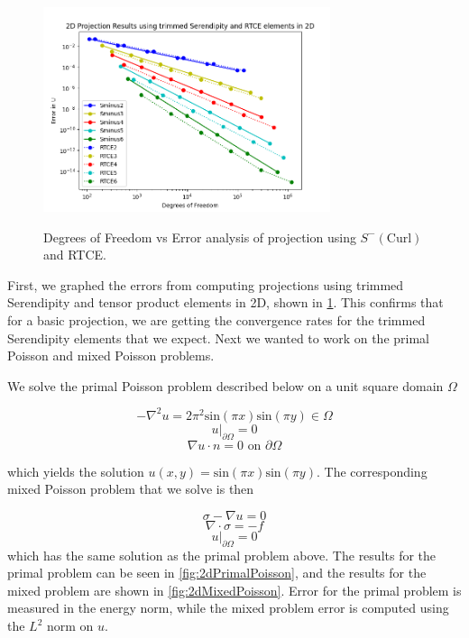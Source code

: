 \documentclass[manuscript,screen]{acmart}
\begin{document}
\begin{figure}[h!]
  \caption{Degrees of Freedom vs Error analysis of projection using $S^-(\text{Curl})$ and RTCE.}
  \includegraphics[width=0.75\textwidth]{2dProjection.png}
  \label{fig:2dProjection}
\end{figure}

\noindent First, we graphed the errors from computing projections using trimmed Serendipity and tensor product elements in 2D, shown in \ref{fig:2dProjection}.  This confirms that for a basic projection, we are getting the convergence rates for the trimmed Serendipity elements that we expect.  Next we wanted to work on the primal Poisson and mixed Poisson problems.

\noindent We solve the primal Poisson problem described below on a unit square domain $\Omega$

\begin{equation}
    -\nabla^2 u = 2\pi^2\text{sin}(\pi x)\text{sin}(\pi y) \in \Omega
\end{equation}
\begin{equation*}
    u\vert_{\partial \Omega} = 0
\end{equation*}
\begin{equation*}
   \nabla u \cdot n = 0 \text{ on } \partial \Omega
\end{equation*}

\noindent which yields the solution $u(x,y) = \text{sin}(\pi x)\text{sin}(\pi y)$.  The corresponding mixed Poisson problem that we solve is then

\begin{equation}
    \sigma - \nabla u = 0
\end{equation}
\begin{equation*}
    \nabla \cdot \sigma = -f
\end{equation*}
\begin{equation*}
    u\vert_{\partial \Omega} = 0
\end{equation*}
\noindent which has the same solution as the primal problem above.  The results for the primal problem can be seen in \ref{fig:2dPrimalPoisson}, and the results for the mixed problem are shown in \ref{fig:2dMixedPoisson}.  Error for the primal problem is measured in the energy norm, while the mixed problem error is computed using the $L^2$ norm on $u$.
\end{document}
